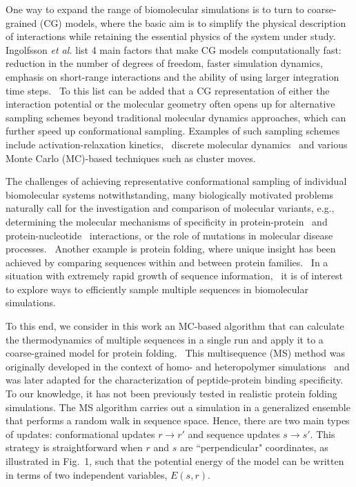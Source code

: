 \documentclass[
aip,
rsi,%
amsmath,amssymb,
reprint,%
]{revtex4-1}
\newcommand	 {\sbar}	{{s}}
\newcommand	 {\rbar}	{{r}}
\begin{document}
One way to expand the range of biomolecular simulations is to turn to coarse-grained (CG) models, where the basic aim is to simplify the physical description of interactions while retaining the essential physics of the system under study.~\cite{Riniker2012} Ingolfsson \textit{et al.} list 4 main factors that make CG models computationally fast: reduction in the number of degrees of freedom, faster simulation dynamics, emphasis on short-range interactions and the ability of using larger integration time steps.~\cite{Ingolfsson2014} To this list can be added that a CG representation of either the interaction potential or the molecular geometry often opens up for alternative sampling schemes beyond traditional molecular dynamics approaches, which can further speed up conformational sampling. Examples of such sampling schemes include activation-relaxation kinetics,~\cite{Beland2011} discrete molecular dynamics~\cite{Proctor2011} and various Monte Carlo (MC)-based techniques such as cluster moves.~\cite{Vitalis2009} 

The challenges of achieving representative conformational sampling of individual biomolecular systems notwithstanding, many biologically motivated problems naturally call for the investigation and comparison of molecular variants, e.g., determining the molecular mechanisms of specificity in protein-protein~\cite{Zarrinpar2003,Hakes2007} and protein-nucleotide~\cite{Rohs2010} interactions, or the role of mutations in molecular disease processes.~\cite{Ross2004} Another example is protein folding, where unique insight has been achieved by comparing sequences within and between protein families.~\cite{Tzul2017,Wensley2010} In a situation with extremely rapid growth of sequence information,~\cite{Vukmirovic2000} it is of interest to explore ways to efficiently sample multiple sequences in biomolecular simulations. 

To this end, we consider in this work an MC-based algorithm that can calculate the thermodynamics of multiple sequences in a single run and apply it to a coarse-grained model for protein folding.~\cite{Bhattacherjee2012} This multisequence (MS) method was originally developed in the context of homo- and heteropolymer simulations~\cite{Irback1995} and was later adapted for the characterization of peptide-protein binding specificity.~\cite{Bhattacherjee2013,Wallin2017} To our knowledge, it has not been previously tested in realistic protein folding simulations. The MS algorithm carries out a simulation in a generalized ensemble that performs a random walk in sequence space. Hence, there are two main types of updates: conformational updates $\rbar\rightarrow\rbar'$ and sequence updates $\sbar\rightarrow\sbar'$. This strategy is straightforward when $\rbar$ and $\sbar$ are ``perpendicular" coordinates, as illustrated in Fig.~1,  such that the potential energy of the model can be written in terms of two independent variables, $E(\sbar,\rbar)$. 
\end{document}
